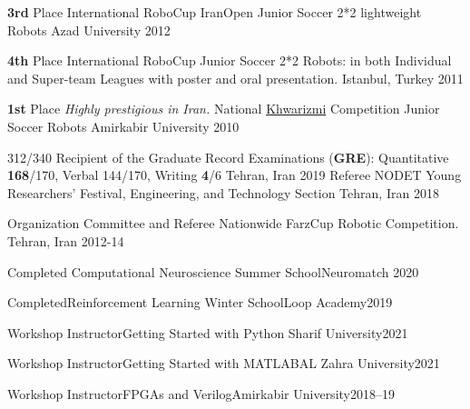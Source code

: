 \begin{cvhonors}
  \cvhonor
      {\textbf{3rd} Place}
      {International RoboCup IranOpen Junior Soccer 2*2 lightweight Robots}
      { Azad University}
        {2012}
        
   \cvhonor
   {\textbf{4th} Place}
    {International RoboCup Junior Soccer 2*2 Robots: in both Individual and Super-team Leagues with poster and oral presentation.}
    {Istanbul, Turkey}
	{2011}
  
    
  \cvhonor
  {\textbf{1st} Place}
  {\textit{Highly prestigious in Iran.} National \href{https://en.wikipedia.org/wiki/Khwarizmi_International_Award}{Khwarizmi} Competition Junior Soccer Robots}
  {Amirkabir University}
	{2010}
\end{cvhonors}

\pagebreak




\begin{cvhonors}

  \cvhonor
    {312/340} %
    {Recipient of the Graduate Record Examinations (\textbf{GRE}): Quantitative \textbf{168}/170, Verbal 144/170, Writing \textbf{4}/6} %
    {Tehran, Iran} %
    {2019} %
     \cvhonor
  {Referee}
  {NODET Young Researchers’ Festival, Engineering, and Technology Section}
  {Tehran, Iran}
	{2018}

  \cvhonor
    {Organization Committee and Referee}
    {Nationwide FarzCup Robotic Competition.}
    {Tehran, Iran}
    {2012-14}

    
\cvhonor
{Completed}
{Computational Neuroscience Summer School}{Neuromatch}
{2020}

\cvhonor
{Completed}{Reinforcement Learning Winter School}{Loop Academy}{2019}

\cvhonor
{Workshop Instructor}{Getting Started with Python}{ Sharif University}{2021}

\cvhonor
{Workshop Instructor}{Getting Started with MATLAB}{AL Zahra University}{2021}

\cvhonor
{Workshop Instructor}{FPGAs and Verilog}{Amirkabir University}{2018–19}
\end{cvhonors}